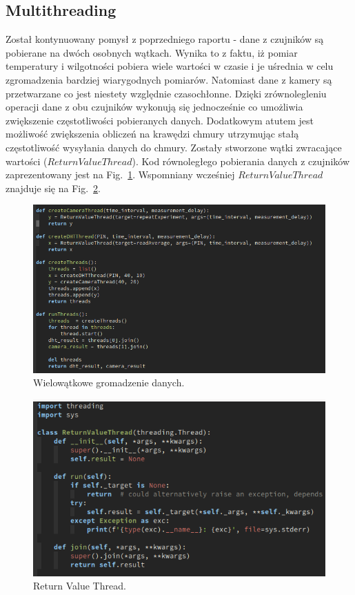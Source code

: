 \documentclass{article}
\begin{document}
\subsection{Multithreading}
Został kontynuowany pomysł z poprzedniego raportu - dane z czujników są pobierane na dwóch osobnych wątkach. Wynika to z faktu, iż pomiar temperatury i wilgotności pobiera wiele wartości w czasie i je uśrednia w celu zgromadzenia bardziej wiarygodnych pomiarów. Natomiast dane z kamery są przetwarzane co jest niestety względnie czasochłonne. Dzięki zrównolegleniu operacji dane z obu czujników wykonują się jednocześnie co umożliwia zwiększenie częstotliwości pobieranych danych. Dodatkowym atutem jest możliwość zwiększenia obliczeń na krawędzi chmury utrzymując stałą częstotliwość wysyłania danych do chmury. Zostały stworzone wątki zwracające wartości ($ReturnValueThread$). Kod równoległego pobierania danych z czujników zaprezentowany jest na Fig.~\ref{fig:watki}. Wspomniany wcześniej $ReturnValueThread$ znajduje się na Fig.~\ref{fig:ret}.
  \begin{figure}
  \centering
  \includegraphics[width=\textwidth]{watki.png}
  \caption{Wielowątkowe gromadzenie danych.} \label{fig:watki}    
  \end{figure}

  \begin{figure}
  \centering
  \includegraphics[width=\textwidth]{return.png}
  \caption{Return Value Thread.} \label{fig:ret}    
\end{figure}  
\end{document}

